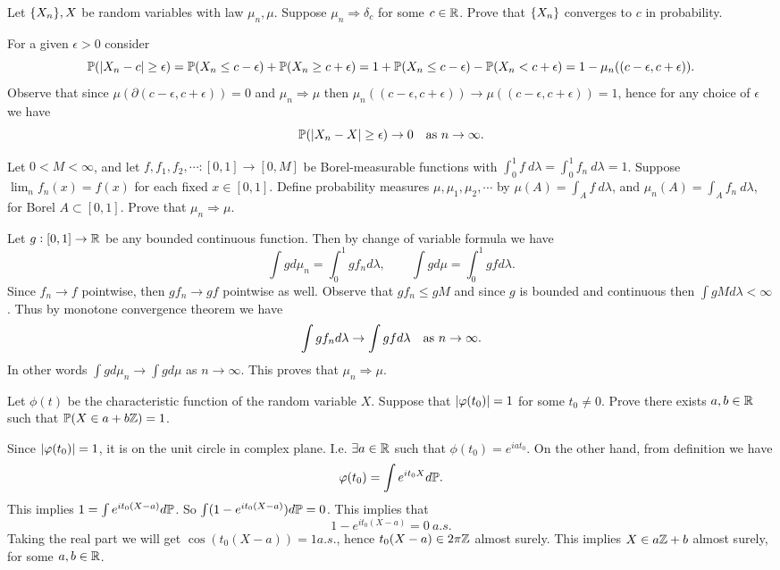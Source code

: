 \begin{problem}
	Let $ \{X_n\}, X $ be random variables with law $ \mu_n, \mu$. Suppose $ \mu_n \Rightarrow \delta_c $ for some $ c \in \mathbb{R} $. Prove that $ \{X_n\} $ converges to $ c $ in probability.
\end{problem}
\begin{solution}
	For a given $ \epsilon>0 $ consider
	\[ \mathbb{P}(|X_n - c| \geq \epsilon) = \mathbb{P}(X_n \leq c - \epsilon) + \mathbb{P}(X_n \geq c + \epsilon) = 1 + \mathbb{P}(X_n \leq c - \epsilon) - \mathbb{P}(X_n < c+\epsilon) = 1 - \mu_n((c-\epsilon,c+\epsilon)).  \]
	Observe that since $ \mu(\partial(c-\epsilon,c+\epsilon)) = 0 $ and $ \mu_n \Rightarrow \mu $  then $ \mu_n((c-\epsilon,c+\epsilon)) \to \mu((c-\epsilon,c+\epsilon)) = 1  $, hence for any choice of $ \epsilon $ we have
	\[ \mathbb{P}(|X_n - X| \geq \epsilon) \to 0 \quad \text{as $ n\to\infty $}. \]
\end{solution}

\begin{problem}
	Let $ 0 < M < \infty $, and let $ f,f_1,f_2,\cdots: [0,1] \to [0,M] $ be Borel-measurable functions with $ \int_{0}^{1}f\ d\lambda = \int_{0}^{1} f_n\ d\lambda = 1 $. Suppose $ \lim_n f_n(x) = f(x) $ for each fixed $ x\in [0,1] $. Define probability  measures $ \mu,\mu_1,\mu_2,\cdots $ by $ \mu(A) = \int_{A} f\ d\lambda $, and $ \mu_n(A) = \int_A f_n\ d\lambda $, for Borel $ A \subset [0,1] $. Prove that $ \mu_n \Rightarrow \mu $.
\end{problem}
\begin{solution}
	Let $ g: [0,1]\to\mathbb{R} $ be any bounded continuous function. Then by change of variable formula we have
	\[ \int g d\mu_n = \int_0^1 g f_n d\lambda, \qquad \int g d\mu = \int_0^1 gf d\lambda. \]
	Since $ f_n \to f $ pointwise, then $ gf_n \to gf $ pointwise as well. Observe that $ gf_n \leq gM $ and since $ g $ is bounded and continuous then $ \int gM d\lambda < \infty $. Thus by monotone convergence theorem we have
	\[ \int {gf_n} {d\lambda} \to \int gf d\lambda \quad \text{as $ n\to\infty $}. \]
	In other words $ \int g d\mu_n \to \int g d\mu $ as $ n\to\infty $. This proves that $ \mu_n \Rightarrow \mu $.
\end{solution}


\begin{problem}
	Let $ \phi(t) $ be the characteristic function of the random variable $ X $. Suppose that $ |\varphi(t_0)| = 1 $ for some $ t_0 \neq 0 $. Prove there exists $ a,b \in \mathbb{R} $ such that $ \mathbb{P}(X \in a + b\mathbb{Z}) = 1 $.
\end{problem}
\begin{solution}
	Since $ |\varphi(t_0)| = 1 $, it is on the unit circle in complex plane. I.e. $ \exists a \in \mathbb{R} $ such that $ \phi(t_0) = e^{iat_0} $. On the other hand, from definition we have
	\[ \varphi(t_0) = \int e^{it_0 X} d\mathbb{P}. \]
	This implies $ 1 = \int e^{it_0(X-a)} d\mathbb{P} $. So $ \int (1-e^{it_0(X-a)}) d\mathbb{P} = 0 $. This implies that 
	\[ 1 - e^{it_0(X-a)} = 0\ a.s. \]
	Taking the real part we will get $ \cos(t_0(X-a)) = 1 a.s. $, hence $ t_0(X-a)\in 2\pi\mathbb{Z} $ almost surely. This implies $ X \in a\mathbb{Z} + b $ almost surely, for some $ a,b \in \mathbb{R} $.
\end{solution}

